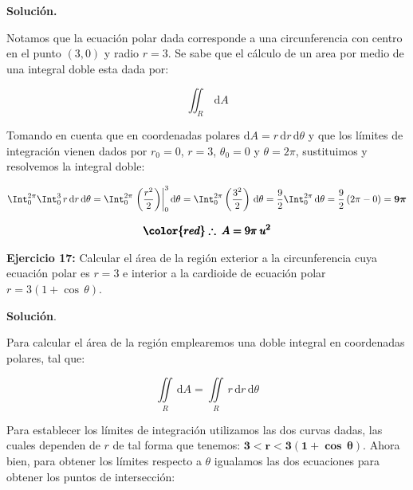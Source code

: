 \documentclass[12pt]{article}
\begin{document}
\vspace{5mm}

\noindent \textbf{Solución.}

\vspace{3mm}

\noindent Notamos que la ecuación polar dada corresponde a una circunferencia con centro en el punto $(3, 0)$ y radio $r=3$. Se sabe que el cálculo de un area por medio de una integral doble esta dada por:

\begin{equation*}
	\iint_R\, \mathrm{d}A
\end{equation*}

\noindent Tomando en cuenta que en coordenadas polares $\mathrm{d}A = r\,\mathrm{d}r\,\mathrm{d}\theta$ y que los límites de integración vienen dados por $r_0 = 0$, $r = 3$, $\theta_0 = 0$ y $\theta = 2\pi$, sustituimos y resolvemos la integral doble:

\begin{align*}
	\Int_0^{2\pi} \Int_0^3\, r\,\mathrm{d}r\,\mathrm{d}\theta = \Int_0^{2\pi} \left.\left(\frac{r^2}{2}\right)\right|_0^3\mathrm{d}\theta = \Int_0^{2\pi} \left(\frac{3^2}{2}\right)\,\mathrm{d}\theta = \frac{9}{2}\Int_0^{2\pi} \,\mathrm{d}\theta = \frac{9}{2}\left(2\pi - 0\right) = \boldsymbol{9\pi}
\end{align*}

\begin{align*}
	\pmb{\color{red} \therefore\: A = 9\pi\: u^2}
\end{align*}

\noindent \textbf{Ejercicio 17:} Calcular el área de la región exterior a la circunferencia cuya ecuación polar es $r=3$ e interior a la cardioide de ecuación polar $r=3(1+\cos\,\theta)$.

\vspace{5mm}

\noindent \textbf{Solución}.

\vspace{3mm}

\noindent Para calcular el área de la región emplearemos una doble integral en coordenadas polares, tal que:

\begin{equation}\label{eqn:17-1}\tag{1}
	\iint\limits_R\, \mathrm{d}A = \iint\limits_R\, r\,\mathrm{d}r\,\mathrm{d}\theta
\end{equation}

\noindent Para establecer los límites de integración utilizamos las dos curvas dadas, las cuales dependen de $r$ de tal forma que tenemos: $\boldsymbol{3<r<3(1+\cos\,\theta)}$. Ahora bien, para obtener los límites respecto a $\theta$ igualamos las dos ecuaciones para obtener los puntos de intersección:
\end{document}
